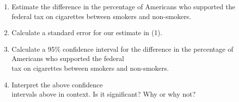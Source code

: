 \documentclass[11pt]{book}\usepackage[]{graphicx}\usepackage[]{color}
\begin{document}
\begin{exercises}
\begin{exercise}
	  \begin{enumerate}
	  \item Estimate the difference in the percentage of Americans who supported the \\ federal tax on cigarettes between smokers and non-smokers.
    \item Calculate a standard error for our estimate in (1).
    \item Calculate a 95\% confidence interval for the difference in the percentage of \\ Americans who supported the federal \\ tax on cigarettes between smokers and non-smokers.
    \item Interpret the above confidence \\ intervals above in context.  Is it significant? Why or why not?
	  \end{enumerate}

	\end{exercise}
%
%


\end{exercises}
\end{document}
